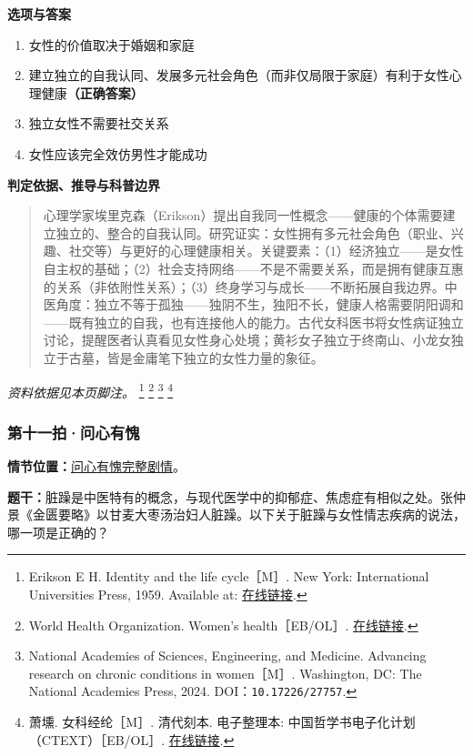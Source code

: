 \textbf{选项与答案}
\begin{enumerate}[label=\Alph*.,leftmargin=*]
  \item 女性的价值取决于婚姻和家庭
  \item 建立独立的自我认同、发展多元社会角色（而非仅局限于家庭）有利于女性心理健康\textbf{（正确答案）}
  \item 独立女性不需要社交关系
  \item 女性应该完全效仿男性才能成功
\end{enumerate}
\textbf{判定依据、推导与科普边界}
\begin{quote}心理学家埃里克森（Erikson）提出自我同一性概念——健康的个体需要建立独立的、整合的自我认同。研究证实：女性拥有多元社会角色（职业、兴趣、社交等）与更好的心理健康相关。关键要素：（1）经济独立——是女性自主权的基础；（2）社会支持网络——不是不需要关系，而是拥有健康互惠的关系（非依附性关系）；（3）终身学习与成长——不断拓展自我边界。中医角度：独立不等于孤独——独阴不生，独阳不长，健康人格需要阴阳调和——既有独立的自我，也有连接他人的能力。古代女科医书将女性病证独立讨论，提醒医者认真看见女性身心处境；黄衫女子独立于终南山、小龙女独立于古墓，皆是金庸笔下独立的女性力量的象征。\end{quote}
\noindent\textit{资料依据见本页脚注。}
\footnote{Erikson E H. Identity and the life cycle［M］. New York: International Universities Press, 1959. Available at: \href{https://archive.org/details/psychologicaliss0001erik}{在线链接}.}
\footnote{World Health Organization. Women’s health［EB/OL］. \href{https://www.who.int/health-topics/women-s-health}{在线链接}.}
\footnote{National Academies of Sciences, Engineering, and Medicine. Advancing research on chronic conditions in women［M］. Washington, DC: The National Academies Press, 2024. DOI：\nolinkurl{10.17226/27757}.}
\footnote{萧壎. 女科经纶［M］. 清代刻本. 电子整理本: 中国哲学书电子化计划（CTEXT）［EB/OL］. \href{https://zh.wikisource.org/zh-hans/女科經綸/序}{在线链接}.}

\subsubsection{第十一拍·问心有愧}\label{question:zhouzhiruo:11}
\textbf{情节位置：}\hyperref[plot:zhouzhiruo:11]{问心有愧完整剧情}。

\textbf{题干：}脏躁是中医特有的概念，与现代医学中的抑郁症、焦虑症有相似之处。张仲景《金匮要略》以甘麦大枣汤治妇人脏躁。以下关于脏躁与女性情志疾病的说法，哪一项是正确的？

